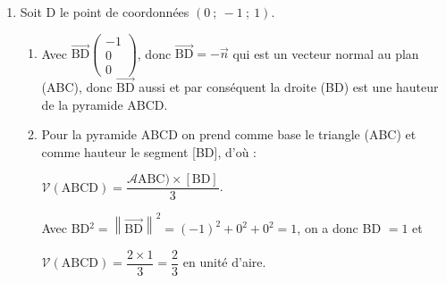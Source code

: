 \documentclass[10pt]{article}
\providecommand{\vect}[1]{\overrightarrow{#1}}
\begin{document}
\begin{enumerate}
\begin{enumerate}
O a donc $\mathcal{A}(\text{ABC}) = \dfrac{\text{BC} \times \text{AH}}{2}$.

Comme BC$^2 = (1 - 1)^2 + (- 1 + 1)^2 + (- 1 - 1)^2 = 0 + 0 + 4$, d'où BC $ = 2$.

Donc $\mathcal{A}(\text{ABC}) = \dfrac{2 \times 2}{2} = 2$.
		

	\end{enumerate}
\item Soit D le point de coordonnées $(0~;~-1~;~1)$.
	\begin{enumerate}
		\item 
		Avec $\vect{\text{BD}}\begin{pmatrix}- 1\\0\\0\end{pmatrix}$, donc $\vect{\text{BD}} = - \vect{n}$ qui est un vecteur normal au plan (ABC), donc $\vect{\text{BD}}$ aussi et par conséquent la droite (BD) est une hauteur de la pyramide ABCD.
		\item 
		Pour la pyramide ABCD on prend comme base le triangle (ABC) et comme hauteur le segment [BD], d'où :
		
		$\mathcal{V}(\text{ABCD}) = \dfrac{\mathcal{A}\text{ABC}) \times [\text{BD}]}{3}$.
		
		Avec BD$^2 = \left\|\vect{\text{BD}}\right\|^2 = (- 1)^2 + 0^2 + 0^2 = 1$, on a donc BD $ = 1$ et 
		
		$\mathcal{V}(\text{ABCD}) = \dfrac{2\times 1}{3} = \dfrac23$ en unité d'aire.
	\end{enumerate}
	




\end{enumerate}

\bigskip
\end{document}
